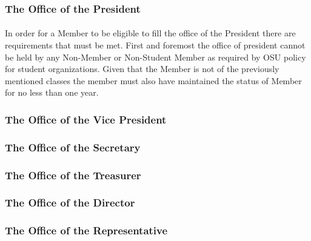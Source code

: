 \documentclass[12pt]{article}
\begin{document}
\subsubsection{The Office of the President}
\paragraph{}
In order for a Member to be eligible to fill the office of the President there are requirements that must be met. First and foremost the office of president cannot be held by any Non-Member or Non-Student Member as required by OSU policy for student organizations. Given that the Member is not of the previously mentioned classes the member must also have maintained the status of Member for no less than one year. 

\subsubsection{The Office of the Vice President}
\paragraph{}

\subsubsection{The Office of the Secretary}
\paragraph{}

\subsubsection{The Office of the Treasurer}
\paragraph{}

\subsubsection{The Office of the Director}
\paragraph{}

\subsubsection{The Office of the Representative}
\paragraph{}
\end{document}
